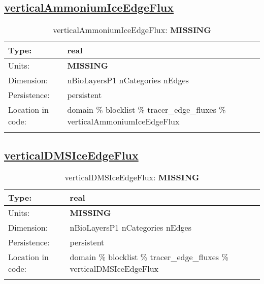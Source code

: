 \subsection[verticalAmmoniumIceEdgeFlux]{\hyperref[sec:var_tab_tracer_edge_fluxes]{verticalAmmoniumIceEdgeFlux}}
\label{subsec:var_sec_tracer_edge_fluxes_verticalAmmoniumIceEdgeFlux}
\begin{center}
\begin{longtable}{| p{2.0in} | p{4.0in} |}
        \hline 
        Type: & real \\
        \hline 
        Units: & {\bf \color{red} MISSING} \\
        \hline 
        Dimension: & nBioLayersP1 nCategories nEdges \\
        \hline 
        Persistence: & persistent \\
        \hline 
         Location in code: & domain \% blocklist \% tracer\_edge\_fluxes \% verticalAmmoniumIceEdgeFlux \\
         \hline 
    \caption{verticalAmmoniumIceEdgeFlux: {\bf \color{red} MISSING}}
\end{longtable}
\end{center}
\subsection[verticalDMSIceEdgeFlux]{\hyperref[sec:var_tab_tracer_edge_fluxes]{verticalDMSIceEdgeFlux}}
\label{subsec:var_sec_tracer_edge_fluxes_verticalDMSIceEdgeFlux}
\begin{center}
\begin{longtable}{| p{2.0in} | p{4.0in} |}
        \hline 
        Type: & real \\
        \hline 
        Units: & {\bf \color{red} MISSING} \\
        \hline 
        Dimension: & nBioLayersP1 nCategories nEdges \\
        \hline 
        Persistence: & persistent \\
        \hline 
         Location in code: & domain \% blocklist \% tracer\_edge\_fluxes \% verticalDMSIceEdgeFlux \\
         \hline 
    \caption{verticalDMSIceEdgeFlux: {\bf \color{red} MISSING}}
\end{longtable}
\end{center}
